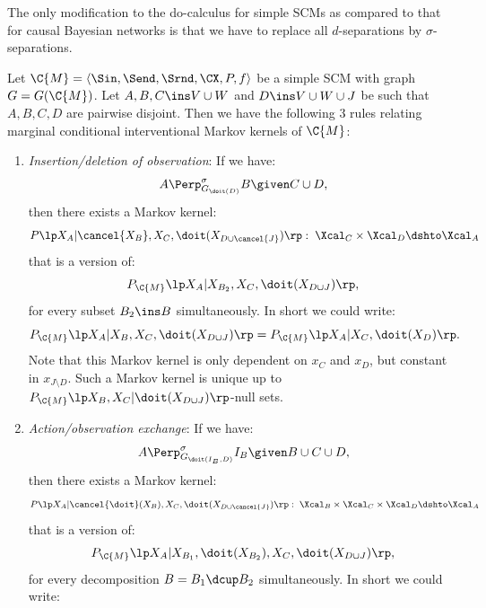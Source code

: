 The only modification to the do-calculus for simple SCMs as compared to that for causal Bayesian networks is that
we have to replace all $d$-separations by $\sigma$-separations.
\begin{Cor}\label{cor:scm_do_calculus}
  Let $\C{M} = \langle \Sin, \Send, \Srnd, \CX, P, f \rangle$ be a simple SCM with graph $G = G(\C{M})$.
  Let $A,B,C \ins V \cup W$ and $D \ins V \cup W \cup J$ be such that $A,B,C,D$ are pairwise disjoint.
  Then we have the following 3 rules relating marginal conditional interventional Markov kernels of $\C{M}$:
    \begin{enumerate}
        \item \emph{Insertion/deletion of observation}: If we have:
            \[ A \Perp^\sigma_{G_{\doit(D)}} B \given C \cup D,   \]
            then there exists a Markov kernel:
            \[ P\lp X_A|\cancel{X_B},X_C,\doit(X_{D\cup \cancel{J}})\rp:\;  \Xcal_C \times \Xcal_{D} \dshto \Xcal_A \]
            that is a version of:
            \[P_{\C{M}}\lp X_A|X_{B_2},X_C,\doit(X_{D\cup J})\rp,\] 
            for every subset $B_2 \ins B$ simultaneously.
            In short we could write:
            \[ P_{\C{M}}\lp X_A|X_B,X_C,\doit(X_{D\cup J})\rp = P_{\C{M}}\lp X_A|X_C,\doit(X_D)\rp.\]
            Note that this Markov kernel is only dependent on $x_C$ and $x_{D}$, but constant in $x_{J\setminus D}$.
            Such a Markov kernel is unique up to $P_{\C{M}}\lp X_B,X_C|\doit(X_{D\cup J})\rp$-null sets.
         \item \emph{Action/observation exchange}: If we have:
            \[ A \Perp^\sigma_{G_{\doit(I_B,D)}} I_B \given B \cup C \cup D,   \]
            then there exists a Markov kernel:
            \[P\lp X_A|\cancel{\doit}(X_B),X_C,\doit(X_{D\cup \cancel{J}})\rp: \;\Xcal_B \times \Xcal_C \times \Xcal_{D} \dshto \Xcal_A\]
            that is a version of:            
            \[ P_{\C{M}}\lp X_A|X_{B_1},\doit(X_{B_2}),X_C,\doit(X_{D\cup J})\rp, \]
            for every decomposition $B=B_1\dcup B_2$ simultaneously. In short we could write:

\end{enumerate}
\end{Cor}
